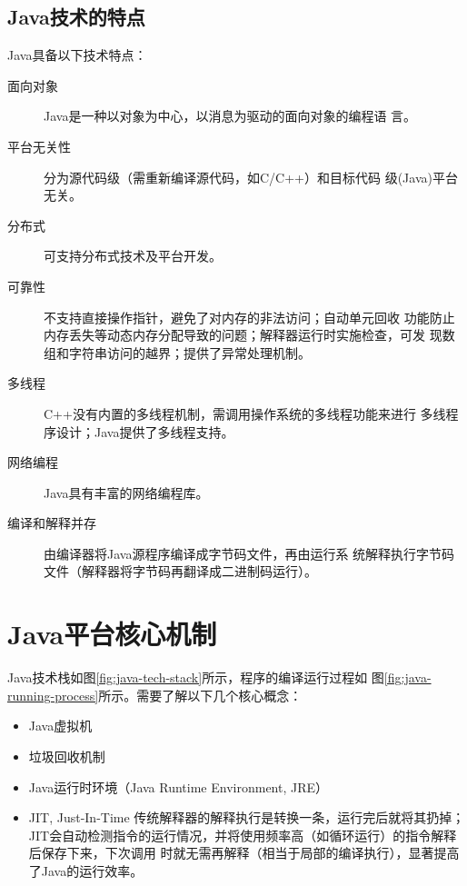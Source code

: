 \subsection{Java技术的特点}

Java具备以下技术特点：

\begin{description}
\item[面向对象] Java是一种以对象为中心，以消息为驱动的面向对象的编程语
  言。
\item[平台无关性] 分为源代码级（需重新编译源代码，如C/C++）和目标代码
  级(Java)平台无关。
\item[分布式] 可支持分布式技术及平台开发。
\item[可靠性] 不支持直接操作指针，避免了对内存的非法访问；自动单元回收
  功能防止内存丢失等动态内存分配导致的问题；解释器运行时实施检查，可发
  现数组和字符串访问的越界；提供了异常处理机制。
\item[多线程] C++没有内置的多线程机制，需调用操作系统的多线程功能来进行
  多线程序设计；Java提供了多线程支持。
\item[网络编程] Java具有丰富的网络编程库。
\item[编译和解释并存] 由编译器将Java源程序编译成字节码文件，再由运行系
  统解释执行字节码文件（解释器将字节码再翻译成二进制码运行）。
\end{description}

\section{Java平台核心机制}


Java技术栈如图\ref{fig:java-tech-stack}所示，程序的编译运行过程如
图\ref{fig:java-running-process}所示。需要了解以下几个核心概念：

\begin{itemize}
\item Java虚拟机
\item 垃圾回收机制
\item Java运行时环境（Java Runtime Environment, JRE）
\item JIT, Just-In-Time 传统解释器的解释执行是转换一条，运行完后就将其扔掉；
  JIT会自动检测指令的运行情况，并将使用频率高（如循环运行）的指令解释后保存下来，下次调用
  时就无需再解释（相当于局部的编译执行），显著提高了Java的运行效率。
\end{itemize}

